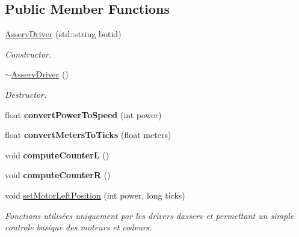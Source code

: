 \subsection*{Public Member Functions}
\begin{DoxyCompactItemize}
\item 
\mbox{\label{classAsservDriver_a2ea943e6faf4d9b6d4c2a61b85849194}} 
\hyperlink{classAsservDriver_a2ea943e6faf4d9b6d4c2a61b85849194}{Asserv\+Driver} (std\+::string botid)
\begin{DoxyCompactList}\small\item\em Constructor. \end{DoxyCompactList}\item 
\mbox{\label{classAsservDriver_a5960b3ced1e727d33ded6ff469fc1a78}} 
\hyperlink{classAsservDriver_a5960b3ced1e727d33ded6ff469fc1a78}{$\sim$\+Asserv\+Driver} ()
\begin{DoxyCompactList}\small\item\em Destructor. \end{DoxyCompactList}\item 
\mbox{\label{classAsservDriver_a10895a322108211299951538aa2ff614}} 
float {\bfseries convert\+Power\+To\+Speed} (int power)
\item 
\mbox{\label{classAsservDriver_aa1febcc45f372e9f0f39bad03a09ebad}} 
float {\bfseries convert\+Meters\+To\+Ticks} (float meters)
\item 
\mbox{\label{classAsservDriver_a8b02e6ec0a124ca9178f17c829d48513}} 
void {\bfseries compute\+CounterL} ()
\item 
\mbox{\label{classAsservDriver_af852b42fef0dbd773141d5e5fd0a74f6}} 
void {\bfseries compute\+CounterR} ()
\item 
\mbox{\label{classAsservDriver_a49dad05da23fe62aa4bf582199eaa3a6}} 
void \hyperlink{classAsservDriver_a49dad05da23fe62aa4bf582199eaa3a6}{set\+Motor\+Left\+Position} (int power, long ticks)
\begin{DoxyCompactList}\small\item\em Fonctions utilisées uniquement par les drivers d\textquotesingle{}asserv et permettant un simple controle basique des moteurs et codeurs. \end{DoxyCompactList}\item 

\end{DoxyCompactItemize}
